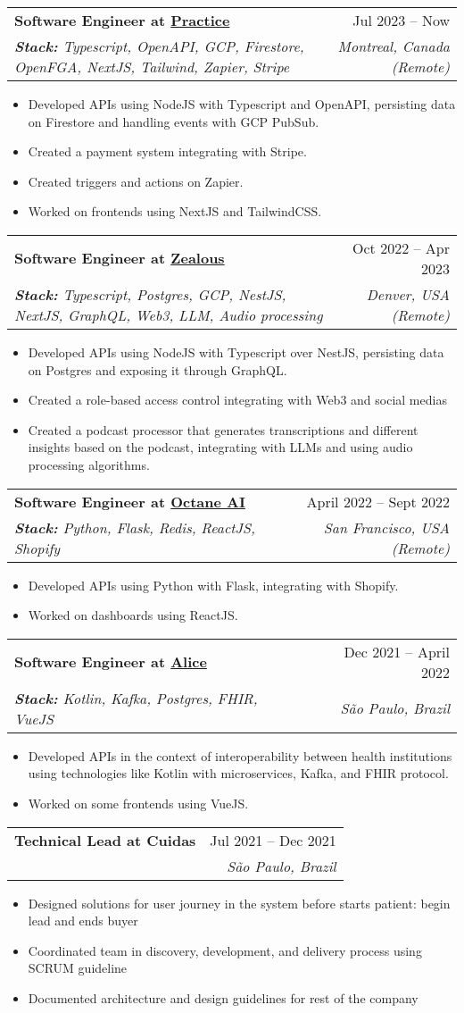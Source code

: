 \documentclass[letterpaper,10pt]{article}
\makeatletter
\newcommand{\resumeItem}[1]{
  \item\footnotesize{
    {#1 \vspace{-2pt}}
  }
}
\newcommand{\resumeSubheading}[4]{
  \vspace{6pt}\item
    \begin{tabular*}{0.97\textwidth}[t]{l@{\extracolsep{\fill}}r}
      \textbf{\small#1} & \small#2 \\
      \textit{\small#3} & \textit{\small #4} \\
    \end{tabular*}\vspace{-7pt}
}
\newcommand{\resumeItemListStart}{\begin{itemize}}
\newcommand{\resumeItemListEnd}{\end{itemize}\vspace{-5pt}}
\makeatother
\begin{document}
    \resumeSubheading
      {Software Engineer at \href{https://practice.do}{Practice}}{Jul 2023 -- Now}
      {\textbf{Stack:} Typescript, OpenAPI, GCP, Firestore, OpenFGA, NextJS, Tailwind, Zapier, Stripe}      {Montreal, Canada (Remote)}
      \resumeItemListStart
        \resumeItem{Developed APIs using NodeJS with Typescript and OpenAPI, persisting data on Firestore and handling events with GCP PubSub.}
        \resumeItem{Created a payment system integrating with Stripe.}
        \resumeItem{Created triggers and actions on Zapier.}
        \resumeItem{Worked on frontends using NextJS and TailwindCSS.}
    \resumeItemListEnd

    \resumeSubheading
      {Software Engineer at \href{https://zealous.app/}{Zealous}}{Oct 2022 -- Apr 2023}
      {\textbf{Stack:} Typescript, Postgres, GCP, NestJS, NextJS, GraphQL, Web3, LLM, Audio processing}{Denver, USA (Remote)}
      \resumeItemListStart
        \resumeItem{Developed APIs using NodeJS with Typescript over NestJS, persisting data on Postgres and exposing it through GraphQL.}
        \resumeItem{Created a role-based access control integrating with Web3 and social medias}
        \resumeItem{Created a podcast processor that generates transcriptions and different insights based on the podcast, integrating with LLMs and using audio processing algorithms.}
      \resumeItemListEnd

      \resumeSubheading
      {Software Engineer at \href{https://www.octaneai.com/}{Octane AI}}{April 2022 -- Sept 2022}
      {\textbf{Stack:} Python, Flask, Redis, ReactJS, Shopify}{San Francisco, USA (Remote)}
      \resumeItemListStart
        \resumeItem{Developed APIs using Python with Flask, integrating with Shopify.}
        \resumeItem{Worked on dashboards using ReactJS.}
      \resumeItemListEnd   

      \resumeSubheading
      {Software Engineer at \href{https://alice.com.br/}{Alice}}{Dec 2021 -- April 2022}
      {\textbf{Stack:} Kotlin, Kafka, Postgres, FHIR, VueJS}{São Paulo, Brazil}
      \resumeItemListStart
        \resumeItem{Developed APIs in the context of interoperability between health institutions using technologies like Kotlin with microservices, Kafka, and FHIR protocol.}
        \resumeItem{Worked on some frontends using VueJS.}
      \resumeItemListEnd     
      
      \resumeSubheading
      {Technical Lead at Cuidas}{Jul 2021 -- Dec 2021}
      {}{São Paulo, Brazil}
      \resumeItemListStart
        \resumeItem{Designed solutions for user journey in the system before starts patient: begin lead and ends buyer}        
        \resumeItem{Coordinated team in discovery, development, and delivery process using SCRUM guideline}        
        \resumeItem{Documented architecture and design guidelines for rest of the company}   
      \resumeItemListEnd 
        
\end{document}

